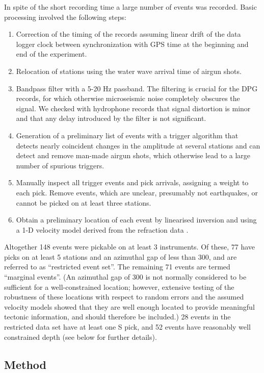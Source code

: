 \documentclass[aguplus]{aguplus}
\newlength{\tw}
\begin{document}
\begin{article}
 In spite of the short recording time a large number of events was
recorded. Basic processing involved the following steps:
\begin{enumerate}
\item
Correction of the timing of the records assuming  linear drift
of the data logger clock between synchronization with GPS time at the
beginning and end of the experiment.
\item Relocation of stations using the water wave arrival time of
airgun shots.
\item Bandpass filter with a 5-20 Hz passband.  The
filtering is crucial for the DPG records, for which otherwise
microseismic noise completely obscures the signal. We checked with
hydrophone records that signal distortion is minor and that any delay introduced by
the filter is not significant.
\item Generation of  a preliminary list of events
with a trigger algorithm that  detects nearly
coincident changes in the amplitude at several stations and can
detect and remove man-made airgun shots, which otherwise lead to a
large number of spurious triggers.
\item Manually inspect all trigger events and pick arrivals, assigning
a weight to each pick. Remove
events, which are unclear, presumably not earthquakes, or cannot be
picked on at least three stations.
\item Obtain a preliminary location of each event by linearised
inversion and using a 1-D velocity model derived from the refraction
data \citetext{see \citealp{planert-con03}, and section~\ref{sec:refraction} below}.
\end{enumerate}
Altogether 148 events were pickable on at least 3 instruments. Of
these, 77 have picks on at least 5 stations and an azimuthal gap of
less than 300\dg, and are referred to as ``restricted event set''. The
remaining 71 events are termed ``marginal events''. (An azimuthal gap
of 300{\dg} is not normally considered to be sufficient for a
well-constrained location; however, extensive testing of the
robustness of these locations with respect to random errors and the
assumed velocity models showed that they are well enough located to
provide meaningful tectonic information, and should therefore be included.)
28 events in the
restricted data set
 have at least one S pick, and 52 events have reasonably well
constrained depth (see below for further details).

\subsection{Method}


\end{article}
\end{document}
